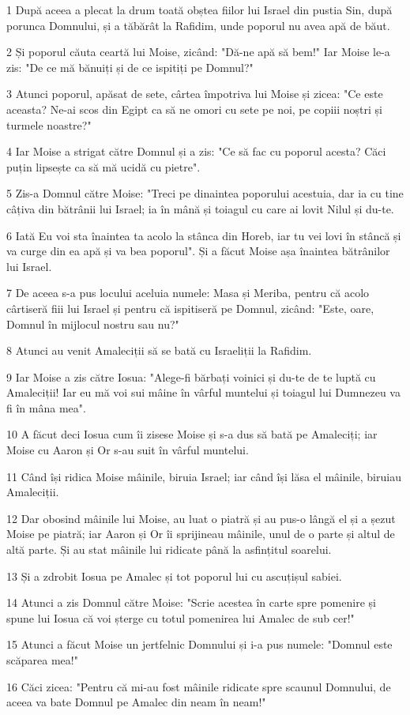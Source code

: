 \par 1 După aceea a plecat la drum toată obștea fiilor lui Israel din pustia Sin, după porunca Domnului, și a tăbărât la Rafidim, unde poporul nu avea apă de băut.
\par 2 Și poporul căuta ceartă lui Moise, zicând: "Dă-ne apă să bem!" Iar Moise le-a zis: "De ce mă bănuiți și de ce ispitiți pe Domnul?"
\par 3 Atunci poporul, apăsat de sete, cârtea împotriva lui Moise și zicea: "Ce este aceasta? Ne-ai scos din Egipt ca să ne omori cu sete pe noi, pe copiii noștri și turmele noastre?"
\par 4 Iar Moise a strigat către Domnul și a zis: "Ce să fac cu poporul acesta? Căci puțin lipsește ca să mă ucidă cu pietre".
\par 5 Zis-a Domnul către Moise: "Treci pe dinaintea poporului acestuia, dar ia cu tine câțiva din bătrânii lui Israel; ia în mână și toiagul cu care ai lovit Nilul și du-te.
\par 6 Iată Eu voi sta înaintea ta acolo la stânca din Horeb, iar tu vei lovi în stâncă și va curge din ea apă și va bea poporul". Și a făcut Moise așa înaintea bătrânilor lui Israel.
\par 7 De aceea s-a pus locului aceluia numele: Masa și Meriba, pentru că acolo cârtiseră fiii lui Israel și pentru că ispitiseră pe Domnul, zicând: "Este, oare, Domnul în mijlocul nostru sau nu?"
\par 8 Atunci au venit Amaleciții să se bată cu Israeliții la Rafidim.
\par 9 Iar Moise a zis către Iosua: "Alege-fi bărbați voinici și du-te de te luptă cu Amaleciții! Iar eu mă voi sui mâine în vârful muntelui și toiagul lui Dumnezeu va fi în mâna mea".
\par 10 A făcut deci Iosua cum îi zisese Moise și s-a dus să bată pe Amaleciți; iar Moise cu Aaron și Or s-au suit în vârful muntelui.
\par 11 Când își ridica Moise mâinile, biruia Israel; iar când își lăsa el mâinile, biruiau Amaleciții.
\par 12 Dar obosind mâinile lui Moise, au luat o piatră și au pus-o lângă el și a șezut Moise pe piatră; iar Aaron și Or îi sprijineau mâinile, unul de o parte și altul de altă parte. Și au stat mâinile lui ridicate până la asfințitul soarelui.
\par 13 Și a zdrobit Iosua pe Amalec și tot poporul lui cu ascuțișul sabiei.
\par 14 Atunci a zis Domnul către Moise: "Scrie acestea în carte spre pomenire și spune lui Iosua că voi șterge cu totul pomenirea lui Amalec de sub cer!"
\par 15 Atunci a făcut Moise un jertfelnic Domnului și i-a pus numele: "Domnul este scăparea mea!"
\par 16 Căci zicea: "Pentru că mi-au fost mâinile ridicate spre scaunul Domnului, de aceea va bate Domnul pe Amalec din neam în neam!"

